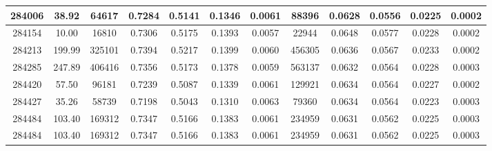 \documentclass[10pt]{extarticle}
\begin{document}
\begin{longtable}{|c|c|c|c|c|c|c|c|c|c|c|c|}
\hline 
284006&38.92&64617&0.7284&0.5141&0.1346&0.0061&88396&0.0628&0.0556&0.0225&0.0002 \\ 
\hline 
284154&10.00&16810&0.7306&0.5175&0.1393&0.0057&22944&0.0648&0.0577&0.0228&0.0002 \\ 
\hline 
284213&199.99&325101&0.7394&0.5217&0.1399&0.0060&456305&0.0636&0.0567&0.0233&0.0002 \\ 
\hline 
284285&247.89&406416&0.7356&0.5173&0.1378&0.0059&563137&0.0632&0.0564&0.0228&0.0003 \\ 
\hline 
284420&57.50&96181&0.7239&0.5087&0.1339&0.0061&129921&0.0634&0.0564&0.0227&0.0002 \\ 
\hline 
284427&35.26&58739&0.7198&0.5043&0.1310&0.0063&79360&0.0634&0.0564&0.0223&0.0003 \\ 
\hline 
284484&103.40&169312&0.7347&0.5166&0.1383&0.0061&234959&0.0631&0.0562&0.0225&0.0003 \\ 
\hline 
284484&103.40&169312&0.7347&0.5166&0.1383&0.0061&234959&0.0631&0.0562&0.0225&0.0003 \\ 
\hline 
\end{longtable} 
\end{document}

